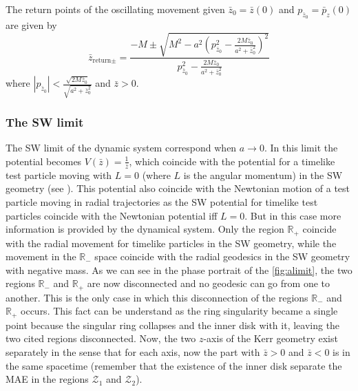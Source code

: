 The return points of the oscillating movement given $\bar{z}_0=\bar{z}(0)$ and $p_{\bar{z}_0}=\bar p_z(0)$ are given by
\begin{equation}
  \bar{z}_{\text{return} \pm} =\frac{-M\pm \sqrt{M^2-a^2 \left(p_{\bar{z}_0}^2-\frac{2 M \bar{z}_0}{a^2+\bar{z}_0^2}\right)^2}}{p_{\bar{z}_0}^2-\frac{2 M \bar{z}_0}{a^2+\bar{z}_0^2}}
\end{equation}
where $|p_{\bar{z}_0}|<\frac{\sqrt{2 M \bar{z}_0} }{\sqrt{a^2+\bar{z}_0^2}}$ and $\bar z>0$.

\subsubsection{The \gls{SW} limit}

The \gls{SW} limit of the dynamic system correspond when $a\to 0$. In this limit the potential becomes $V(\bar z)=\frac{1}{\bar z}$, which coincide with the potential for a timelike test particle moving with $L=0$ (where $L$ is the angular momentum) in the \gls{SW} geometry (see \cite{hawking1973large}). This potential also coincide with the Newtonian motion of a test particle moving in radial trajectories as the \gls{SW} potential for timelike test particles coincide with the Newtonian potential iff $L=0$. But in this case more information is provided by the dynamical system. Only the region $\mathbb{R}_+$ coincide with the radial movement for timelike particles in the \gls{SW} geometry, while the movement in the $\mathbb{R}_-$ space coincide with the radial geodesics in the \gls{SW} geometry with negative mass. As we can see in the phase portrait of the \cref{fig:alimit}, the two regions $\mathbb{R}_-$ and $\mathbb{R}_+$ are now disconnected and no geodesic can go from one to another. This is the only case in which this disconnection of the regions $\mathbb{R}_-$ and $\mathbb{R}_+$ occurs. This fact can be understand as the ring singularity  became a single point because the singular ring collapses and the inner disk with it, leaving the two cited regions disconnected. Now, the two $z$-axis of the Kerr geometry exist separately in the sense that for each axis, now the part with $\bar z>0$ and $\bar z<0$ is in the same spacetime (remember that the existence of the inner disk separate the \gls{MAE} in the regions $\mathcal{Z}_1$ and $\mathcal{Z}_2$). 

